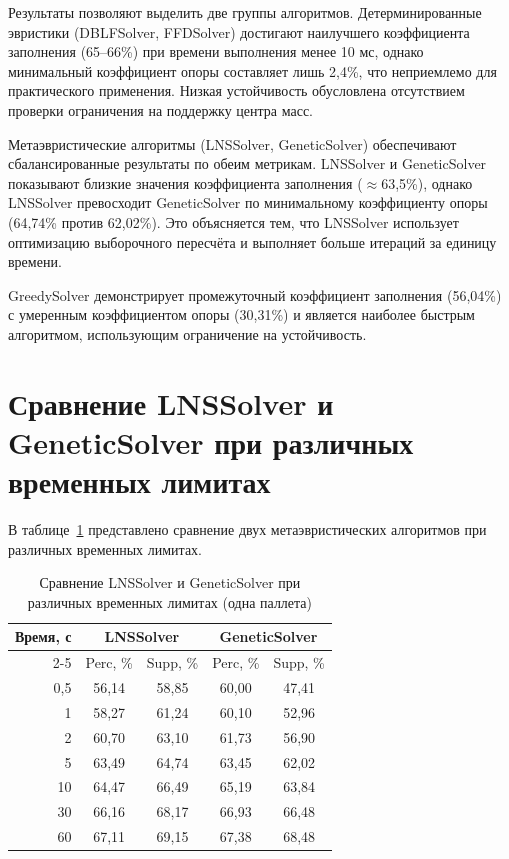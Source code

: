 Результаты позволяют выделить две группы алгоритмов. Детерминированные эвристики (DBLFSolver, FFDSolver) достигают наилучшего коэффициента заполнения (65--66\%) при времени выполнения менее 10 мс, однако минимальный коэффициент опоры составляет лишь 2,4\%, что неприемлемо для практического применения. Низкая устойчивость обусловлена отсутствием проверки ограничения на поддержку центра масс.

Метаэвристические алгоритмы (LNSSolver, GeneticSolver) обеспечивают сбалансированные результаты по обеим метрикам. LNSSolver и GeneticSolver показывают близкие значения коэффициента заполнения ($\approx$63,5\%), однако LNSSolver превосходит GeneticSolver по минимальному коэффициенту опоры (64,74\% против 62,02\%). Это объясняется тем, что LNSSolver использует оптимизацию выборочного пересчёта и выполняет больше итераций за единицу времени.

GreedySolver демонстрирует промежуточный коэффициент заполнения (56,04\%) с умеренным коэффициентом опоры (30,31\%) и является наиболее быстрым алгоритмом, использующим ограничение на устойчивость.

\section{Сравнение LNSSolver и GeneticSolver при различных временных лимитах}

В таблице~\ref{tab:evyukh_lns_vs_genetic} представлено сравнение двух метаэвристических алгоритмов при различных временных лимитах.

\begin{table}[H]
\centering
\caption{Сравнение LNSSolver и GeneticSolver при различных временных лимитах (одна паллета)}
\label{tab:evyukh_lns_vs_genetic}
\begin{tabular}{|r|c|c|c|c|}
\hline
\textbf{Время, с} & \multicolumn{2}{c|}{\textbf{LNSSolver}} & \multicolumn{2}{c|}{\textbf{GeneticSolver}} \\
\cline{2-5}
& Perc, \% & Supp, \% & Perc, \% & Supp, \% \\
\hline
0,5 & 56,14 & 58,85 & 60,00 & 47,41 \\
1   & 58,27 & 61,24 & 60,10 & 52,96 \\
2   & 60,70 & 63,10 & 61,73 & 56,90 \\
5   & 63,49 & 64,74 & 63,45 & 62,02 \\
10  & 64,47 & 66,49 & 65,19 & 63,84 \\
30  & 66,16 & 68,17 & 66,93 & 66,48 \\
60  & 67,11 & 69,15 & 67,38 & 68,48 \\
\hline
\end{tabular}
\end{table}

